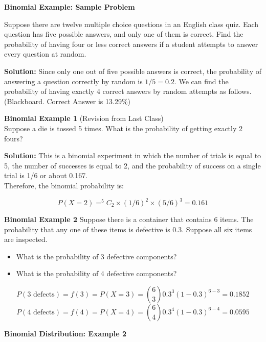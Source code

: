 \documentclass[]{report}
\begin{document}
{%


\item \textbf{Binomial Example: Sample Problem}

Suppose there are twelve multiple choice questions in an English class quiz. Each question has five possible answers, and only one of them is correct. Find the probability of having four or less correct answers if a student attempts to answer every question at random.



\textbf{Solution:}
Since only one out of five possible answers is correct, the probability of answering a question correctly by random is $1/5=0.2$. We can find the probability of having exactly 4 correct answers by random attempts as follows.(Blackboard. Correct Answer is 13.29\%)


\item \textbf{ Binomial Example 1 }
(Revision from Last Class)\\
Suppose a die is tossed 5 times. What is the probability of getting exactly 2 fours?

\textbf{Solution:} This is a binomial experiment in which the number of trials is equal to 5, the number of successes is equal to 2, and the probability of success on a single trial is 1/6 or about 0.167. 
\\
\bigskip
Therefore, the binomial probability is:

\[P(X=2) = ^5C_2 \times (1/6)^2 \times (5/6)^3 = 0.161\]

\textbf{ Binomial Example 2 }
Suppose there is a container that contains 6 items.  The probability that any one of these items is defective is 0.3. Suppose all six items are inspected. 
\begin{itemize}
\item What is the probability of 3 defective components?
\item What is the probability of 4 defective components?
\end{itemize}

\[ P(3\text{ defects}) = f(3) = P(X = 3) = {6\choose 3}0.3^3 (1-0.3)^{6-3} = 0.1852 \]
\[ P(4\text{ defects}) = f(4) = P(X = 4) = {6\choose 4}0.3^4 (1-0.3)^{6-4} = 0.0595 \]


\item \textbf{Binomial Distribution: Example 2}

}
\end{document}
